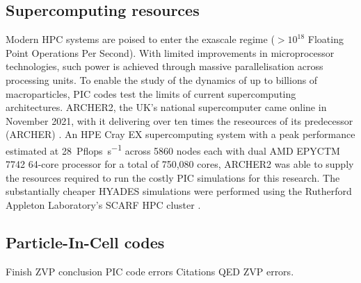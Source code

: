 \subsection{Supercomputing resources}\label{sec:intro-archer}
Modern \ac{HPC} systems are poised to enter the exascale regime ($> 10^{18}$ Floating Point Operations Per Second). With limited improvements in microprocessor technologies, such power is achieved through massive parallelisation across processing units. To enable the study of the dynamics of up to billions of macroparticles, PIC codes test the limits of current supercomputing architectures. ARCHER2, the UK's national supercomputer came online in November 2021, with it delivering over ten times the reseources of its predecessor (ARCHER) \cite{ARCHER2}. An HPE Cray EX supercomputing system with a peak performance estimated at \qty{28}{Pflops.s^{-1}} across 5860 nodes each with dual AMD EPYCTM 7742 64-core processor for a total of 750,080 cores, ARCHER2 was able to supply the resources required to run the costly PIC simulations for this research. The substantially cheaper HYADES simulations were performed using the Rutherford Appleton Laboratory's SCARF \ac{HPC} cluster \cite{SCARFOverview}.

\subsection{Particle-In-Cell codes}
Finish ZVP conclusion
PIC code errors
Citations
QED
ZVP errors.


